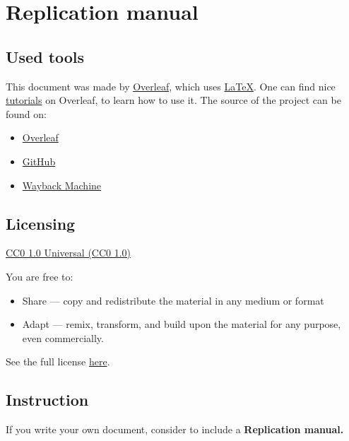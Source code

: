 \documentclass{article}
\begin{document}
\section{Replication manual}

\subsection{Used tools}

This document was made by \href{https://www.overleaf.com/}{Overleaf}, which uses \href{https://en.wikipedia.org/wiki/LaTeX}{LaTeX}.
One can find nice \href{https://www.overleaf.com/learn/latex/Tutorials}{tutorials} on Overleaf, to learn how to use it. The source of the project can be found on:
\begin{itemize}
    \item \href{https://www.overleaf.com/read/vjhvckyttxxx}{Overleaf}
    \item \href{https://github.com/konczer/OpenCurriculum}{GitHub}
    \item \href{https://web.archive.org/web/20211209191853/https://github.com/konczer/OpenCurriculum/blob/main/main.tex}{Wayback Machine}
\end{itemize}

\subsection{Licensing}

\href{https://creativecommons.org/publicdomain/zero/1.0/}{CC0 1.0 Universal (CC0 1.0)}

You are free to:
\begin{itemize}
    \item Share — copy and redistribute the material in any medium or format
    \item Adapt — remix, transform, and build upon the material
    for any purpose, even commercially.
\end{itemize}

See the full license \href{https://creativecommons.org/publicdomain/zero/1.0/legalcode}{here}.

\subsection{Instruction}

If you write your own document, consider to include a \bf{Replication manual}.

\newpage

\tableofcontents \label{sec:toc}
\end{document}
